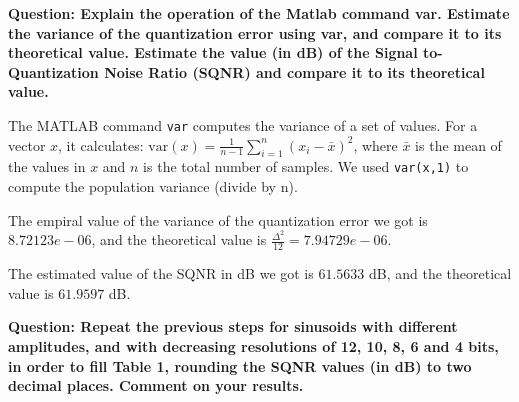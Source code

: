 \documentclass[11pt,a4paper]{article}
\begin{document}
\vspace{1cm}
\textbf{Question: Explain the operation of the Matlab command var. Estimate the variance of the quantization error using var,
    and compare it to its theoretical value. Estimate the value (in dB) of the Signal to-Quantization Noise Ratio (SQNR)
    and compare it to its theoretical value.
}

\vspace{0.5cm}
The MATLAB command \texttt{var} computes the variance of a set of values. For a vector $x$, it calculates:
$\text{var}(x) = \frac{1}{n-1}\sum_{i=1}^n (x_i - \bar{x})^2$, where $\bar{x}$ is the mean of the values in $x$ and $n$ is the total number of samples.
We used \texttt{var(x,1)} to compute the population variance (divide by n).

The empiral value of the variance of the quantization error we got is $8.72123e-06$, and the theoretical value is $\frac{\Delta^2}{12} = 7.94729e-06$.

The estimated value of the SQNR in dB we got is $61.5633$ dB, and the theoretical value is $61.9597$ dB.

\vspace{1cm}
\textbf{Question: Repeat the previous steps for sinusoids with different amplitudes, and with decreasing resolutions
    of 12, 10, 8, 6 and 4 bits, in order to fill Table 1, rounding the SQNR values (in dB) to two
    decimal places. Comment on your results.
}
\end{document}

